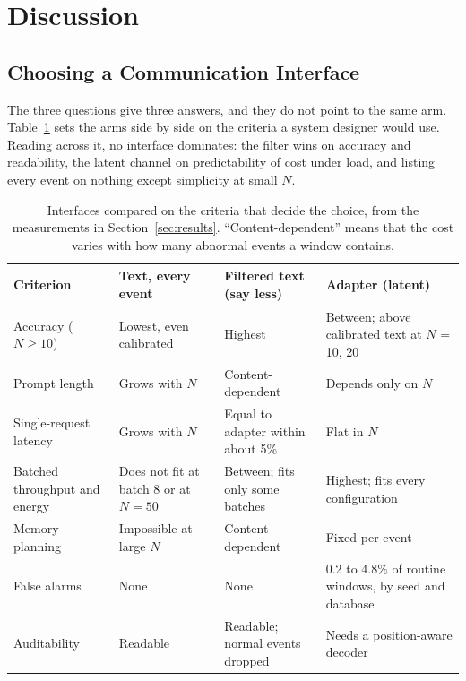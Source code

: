 \section{Discussion}
\label{sec:discussion}

\subsection{Choosing a Communication Interface}
The three questions give three answers, and they do not point to the same arm. Table~\ref{tab:selection} sets the arms side by side on the criteria a system designer would use. Reading across it, no interface dominates: the filter wins on accuracy and readability, the latent channel on predictability of cost under load, and listing every event on nothing except simplicity at small $N$.

\begin{table}[t]
\caption{Interfaces compared on the criteria that decide the choice, from the measurements in Section~\ref{sec:results}. ``Content-dependent'' means that the cost varies with how many abnormal events a window contains.}
\label{tab:selection}
\centering
\footnotesize
\begin{tabular}{p{2.3cm}p{3.1cm}p{3.1cm}p{3.1cm}}
\toprule
Criterion & Text, every event & Filtered text (say less) & Adapter (latent) \\
\midrule
Accuracy ($N\!\ge\!10$) & Lowest, even calibrated & Highest & Between; above calibrated text at $N$ = 10, 20 \\
Prompt length & Grows with $N$ & Content-dependent & Depends only on $N$ \\
Single-request latency & Grows with $N$ & Equal to adapter within about 5\% & Flat in $N$ \\
Batched throughput and energy & Does not fit at batch 8 or at $N=50$ & Between; fits only some batches & Highest; fits every configuration \\
Memory planning & Impossible at large $N$ & Content-dependent & Fixed per event \\
False alarms & None & None & 0.2 to 4.8\% of routine windows, by seed and database \\
Auditability & Readable & Readable; normal events dropped & Needs a position-aware decoder \\
\bottomrule
\end{tabular}
\end{table}

